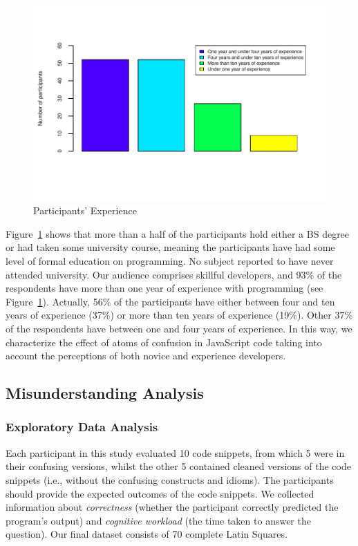   \begin{figure}[htb]
      \centering
      \includegraphics[width=\columnwidth]{images/dem-experience-1.pdf}
      \caption{Participants' Experience} \label{fig:xp}
  \end{figure}

Figure~\ref{fig:xp} shows that more than a half of the participants hold either a BS degree or had taken some university course, meaning the participants have had some level of formal education on programming. No subject reported to have never attended university. Our audience comprises skillful developers, and 93\% of the respondents have more than one year of experience with programming (see Figure~\ref{fig:xp}). Actually, 56\% of the participants have either between four and ten years of experience (37\%) or more than ten years of experience (19\%). Other 37\% of the respondents have between one and four years of experience. In this way, we characterize the effect of atoms of confusion in JavaScript code taking into account the perceptions of both novice and experience developers. 

\subsection{Misunderstanding Analysis}

\subsubsection*{Exploratory Data Analysis}

Each participant in this study evaluated {\color{red}10} code snippets, from which 5 were in their confusing versions, whilst the other 5 contained cleaned versions of the code snippets (i.e., without the confusing constructs and idioms). The participants should provide the expected outcomes of the code snippets. We collected information about \emph{correctness} (whether the participant correctly predicted the program's output) and \emph{cognitive workload} (the time taken to answer the question). Our final dataset consists of 70 complete Latin Squares.


